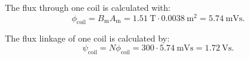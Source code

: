 
\begin{solutionblock}
    The flux through one coil is calculated with:
    $$\phi_{\mathrm{coil}} = B_{\mathrm{m}} A_{\mathrm{m}} = \SI{1.51}{\tesla} \cdot \SI{0.0038}{\metre^2} =  \SI{5.74}{\milli\volt\second}.$$ 
\end{solutionblock}



\begin{solutionblock}
    The flux linkage of one coil is calculated by:
    $$ \psi_{\mathrm{coil}} = N \phi_{\mathrm{coil}} = 300 \cdot \SI{5.74}{\milli\volt\second} = \SI{1.72}{\volt\second}.$$
\end{solutionblock}

